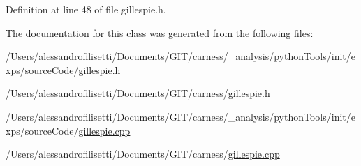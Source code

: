 Definition at line 48 of file gillespie.\-h.



The documentation for this class was generated from the following files\-:\begin{DoxyCompactItemize}
\item 
/\-Users/alessandrofilisetti/\-Documents/\-G\-I\-T/carness/\-\_\-analysis/python\-Tools/init/exps/source\-Code/\hyperlink{a00066}{gillespie.\-h}\item 
/\-Users/alessandrofilisetti/\-Documents/\-G\-I\-T/carness/\hyperlink{a00067}{gillespie.\-h}\item 
/\-Users/alessandrofilisetti/\-Documents/\-G\-I\-T/carness/\-\_\-analysis/python\-Tools/init/exps/source\-Code/\hyperlink{a00064}{gillespie.\-cpp}\item 
/\-Users/alessandrofilisetti/\-Documents/\-G\-I\-T/carness/\hyperlink{a00065}{gillespie.\-cpp}\end{DoxyCompactItemize}
